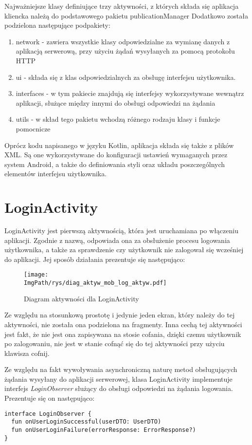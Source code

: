 \documentclass[a4paper,12pt,twoside,openany]{report}
\newcommand{\ImgPath}{.}
\begin{document}
Najważniejsze klasy definiujące trzy aktywności, z których składa się aplikacja kliencka należą do podstawowego pakietu publicationManager
Dodatkowo została podzielona następujące podpakiety:
\begin{enumerate}
 	\item network - zawiera wszystkie klasy odpowiedzialne za wymianę danych z aplikacją serwerową, przy użyciu żądań wysyłanych za pomocą protokołu HTTP
 	\item ui - składa się z klas odpowiedzialnych za obsługę interfejsu użytkownika.
 	\item interfaces - w tym pakiecie znajdują się interfejsy wykorzystywane wewnątrz aplikacji, służące między innymi do obsługi odpowiedzi na żądania
 	\item utils - w skład tego pakietu wchodzą różnego rodzaju klasy i funkcje pomocnicze
\end{enumerate}

Oprócz kodu napisanego w języku Kotlin, aplikacja składa się także z plików XML. Są one wykorzystywane do konfiguracji ustawień wymaganych przez system Android, a także do definiowania styli oraz układu poszczególnych elementów interfejsu użytkownika. 

\section{LoginActivity}
LoginActivity jest pierwszą aktywnością, która jest uruchamiana po włączeniu aplikacji. Zgodnie z nazwą, odpowiada ona za obsłużenie procesu logowania użytkownika, a także za sprawdzenie czy użytkownik nie zalogował się wcześniej do aplikacji. Jej sposób działania prezentuje się następująco: 
\begin{figure}[!htbp]
	\begin{center}
		\centering
		\texttt{[image: \\ImgPath/rys/diag\_aktyw\_mob\_log\_aktyw.pdf]}
	\end{center}
	\caption{Diagram aktywności dla LoginActivity}
	\label{diagramAktywnosciLoginActivity}
\end{figure}

Ze względu na stosunkową prostotę i jedynie jeden ekran, który należy do tej aktywności, nie została ona podzielona na fragmenty. Inna cechą tej aktywności jest fakt, że nie jest ona zapisywana na stosie cofania, dzięki czemu użytkownik po zalogowaniu, nie jest w stanie cofnąć się do tej aktywności przy użyciu klawisza cofnij.

 Ze względu na fakt wywoływania asynchroniczną naturę metod obsługujących żądania wysyłany do aplikacji serwerowej, klasa LoginActivity implementuje interfejs \textit{LoginObserver} służący do obsługi odpowiedzi na żądania logowania. Prezentuje się on następująco:
\begin{verbatim}
interface LoginObserver {
  fun onUserLoginSuccessful(userDTO: UserDTO)  
  fun onUserLoginFailure(errorResponse: ErrorResponse?)
}
\end{verbatim} 
\end{document}
